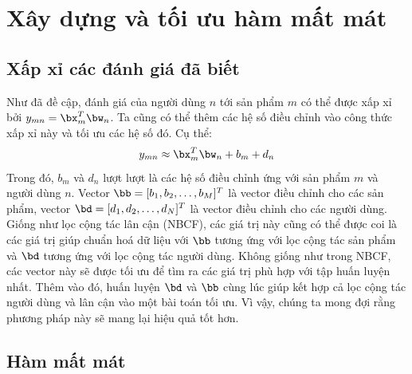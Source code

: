  
 
\section{Xây dựng và tối ưu hàm mất mát}
\label{sec:2_2}
\subsection{Xấp xỉ các đánh giá đã biết}
Như đã đề cập, đánh giá của người dùng $n$ tới sản phẩm $m$ có thể được xấp xỉ
bởi $y_{mn} = \bx^T_m\bw_n$. Ta cũng có thể thêm các hệ số điều chỉnh vào công thức xấp xỉ
này và tối ưu các hệ số đó. Cụ thể: 
\begin{equation}
    y_{mn} \approx \bx_m^T \bw_n + b_m + d_n
\end{equation}
Trong đó, $b_m$ và $d_n$ lượt lượt là các hệ số điều chỉnh ứng với sản phẩm
$m$ và người dùng $n$. Vector $\bb = [b_1, b_2, \dots, b_M]^T$ là vector điều chỉnh
cho các sản phẩm, vector $\bd = [d_1, d_2, \dots, d_N]^T$ là vector điều chỉnh cho các
người dùng. Giống như lọc cộng tác lân cận (NBCF),
các giá trị này cũng có thể được coi là các giá trị giúp chuẩn hoá dữ liệu với
$\bb$ tương ứng với lọc cộng tác sản phẩm và $\bd$ tương ứng với lọc cộng tác người dùng. Không
giống như trong NBCF, các vector này sẽ được tối ưu để tìm ra các giá trị phù hợp với tập huấn luyện nhất. Thêm vào đó, huấn luyện $\bd$ và
$\bb$ cùng lúc giúp kết hợp cả lọc cộng tác người dùng và lân cận vào một bài toán tối
ưu. Vì vậy, chúng ta mong đợi rằng phương pháp này sẽ mang lại hiệu quả tốt hơn.


\subsection{Hàm mất mát }


